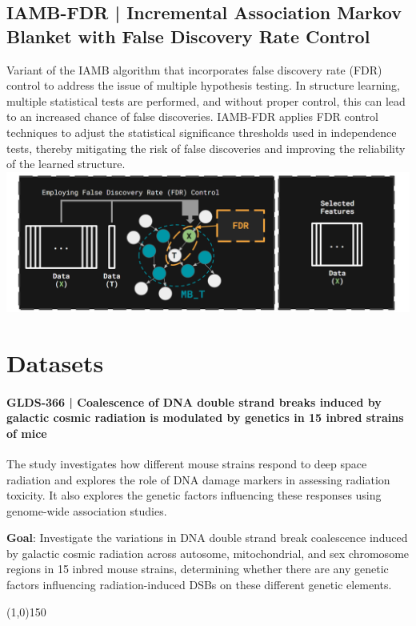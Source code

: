 \documentclass{article}
\begin{document}
\subsection{IAMB-FDR | Incremental Association Markov Blanket with False Discovery Rate Control}
Variant of the IAMB algorithm that incorporates false discovery rate (FDR) control to address the issue of multiple hypothesis testing. 
In structure learning, multiple statistical tests are performed, and without proper control, this can lead to an increased chance of false discoveries. 
IAMB-FDR applies FDR control techniques to adjust the statistical significance thresholds used in independence tests, thereby mitigating the risk of false discoveries and improving the reliability of the learned structure.
\includegraphics[width=\textwidth,height=\textheight,keepaspectratio]{iambfdr.png}



\section{Datasets}
\paragraph{GLDS-366 | Coalescence of DNA double strand breaks induced by galactic cosmic radiation is modulated by genetics in 15 inbred strains of mice}
The study investigates how different mouse strains respond to deep space radiation and explores the role of DNA damage markers in assessing radiation toxicity. It also explores the genetic factors influencing these responses using genome-wide association studies.

\quad\quad\textbf{Goal}: Investigate the variations in DNA double strand break coalescence induced by galactic cosmic radiation across autosome, mitochondrial, and sex chromosome regions in 15 inbred mouse strains, determining whether there are any genetic factors influencing radiation-induced DSBs on these different genetic elements.

\begin{center}
  \line(1,0){150}
\end{center}
\end{document}
